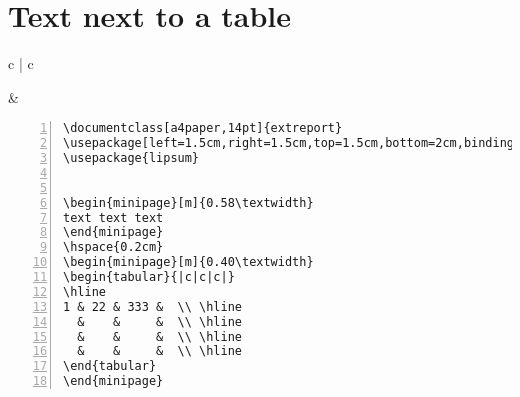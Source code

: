 \section{Text next to a table}
\begin{tabular}{c | c}
\begin{minipage}[m]{0.4\textwidth}
\end{minipage}
&
\begin{minipage}[m]{0.55\textwidth}
\renewcommand\textminus{\mbox{-}}%
\begin{lstlisting}[numberstyle=\zebra{green!15}{yellow!15},numbers=left,basicstyle=\footnotesize] 
\documentclass[a4paper,14pt]{extreport}
\usepackage[left=1.5cm,right=1.5cm,top=1.5cm,bottom=2cm,bindingoffset=0cm]{geometry}
\usepackage{lipsum}


\begin{minipage}[m]{0.58\textwidth}
text text text
\end{minipage}
\hspace{0.2cm}
\begin{minipage}[m]{0.40\textwidth}
\begin{tabular}{|c|c|c|}
\hline
1 & 22 & 333 &  \\ \hline
  &    &     &  \\ \hline
  &    &     &  \\ \hline
  &    &     &  \\ \hline
\end{tabular}
\end{minipage}

\end{lstlisting}
\end{minipage}
\end{tabular}











 
 